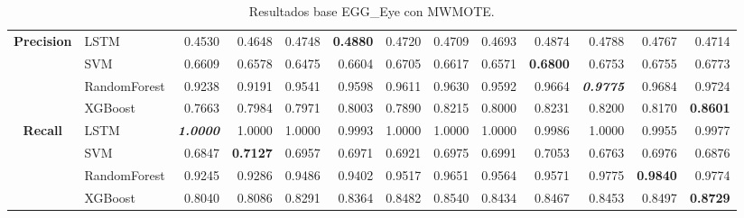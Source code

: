 \begin{table}[H]
\begin{adjustbox}{max width=14cm}
\begin{tabular}{|c|l|r|r|r|r|r|r|r|r|r|r|r|}
			\hline
			\textbf{Precision} &  LSTM &  0.4530 &  0.4648 &  0.4748 & \textbf{  0.4880 } &  0.4720 &  0.4709 &  0.4693 &  0.4874 &  0.4788 &  0.4767 &  0.4714 \\
			&  SVM &  0.6609 &  0.6578 &  0.6475 &  0.6604 &  0.6705 &  0.6617 &  0.6571 & \textbf{  0.6800 } &  0.6753 &  0.6755 &  0.6773 \\
			&  RandomForest &  0.9238 &  0.9191 &  0.9541 &  0.9598 &  0.9611 &  0.9630 &  0.9592 &  0.9664 & \textit{ \textbf{  0.9775 } } &  0.9684 &  0.9724 \\
			&  XGBoost &  0.7663 &  0.7984 &  0.7971 &  0.8003 &  0.7890 &  0.8215 &  0.8000 &  0.8231 &  0.8200 &  0.8170 & \textbf{  0.8601 } \\			
			\hline
			\textbf{Recall} &  LSTM & \textit{ \textbf{  1.0000 } } &  1.0000 &  1.0000 &  0.9993 &  1.0000 &  1.0000 &  1.0000 &  0.9986 &  1.0000 &  0.9955 &  0.9977 \\
			&  SVM &  0.6847 & \textbf{  0.7127 } &  0.6957 &  0.6971 &  0.6921 &  0.6975 &  0.6991 &  0.7053 &  0.6763 &  0.6976 &  0.6876 \\
			&  RandomForest &  0.9245 &  0.9286 &  0.9486 &  0.9402 &  0.9517 &  0.9651 &  0.9564 &  0.9571 &  0.9775 & \textbf{  0.9840 } &  0.9774 \\
			&  XGBoost &  0.8040 &  0.8086 &  0.8291 &  0.8364 &  0.8482 &  0.8540 &  0.8434 &  0.8467 &  0.8453 &  0.8497 & \textbf{  0.8729 } \\			
			\hline
		\end{tabular}
	\end{adjustbox}
	\caption{Resultados base EGG\_Eye con MWMOTE.}
	\label{tab:EGGEyeMWMOTE}
\end{table}

